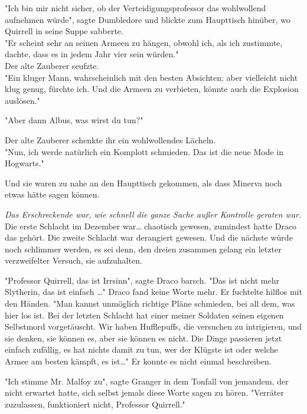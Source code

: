 {"Ich bin mir nicht sicher, ob der Verteidigungsprofessor das wohlwollend aufnehmen würde", sagte Dumbledore und blickte zum Haupttisch hinüber, wo Quirrell in seine Suppe sabberte.\\ "Er scheint sehr an seinen Armeen zu hängen, obwohl ich, als ich zustimmte, dachte, dass es in jedem Jahr vier sein würden."\\ Der alte Zauberer seufzte.\\ "Ein kluger Mann, wahrscheinlich mit den besten Absichten; aber vielleicht nicht klug genug, fürchte ich. Und die Armeen zu verbieten, könnte auch die Explosion auslösen."

"Aber dann Albus, was wirst du tun?"

Der alte Zauberer schenkte ihr ein wohlwollendes Lächeln.\\ "Nun, ich werde natürlich ein Komplott schmieden. Das ist die neue Mode in Hogwarts."

Und sie waren zu nahe an den Haupttisch gekommen, als dass Minerva noch etwas hätte sagen können.

\emph{Das Erschreckende war, wie schnell die ganze Sache außer Kontrolle geraten war.} Die erste Schlacht im Dezember war… chaotisch gewesen, zumindest hatte Draco das gehört. Die zweite Schlacht war derangiert gewesen. Und die nächste würde noch schlimmer werden, es sei denn, den dreien zusammen gelang ein letzter verzweifelter Versuch, sie aufzuhalten.

"Professor Quirrell, das ist Irrsinn", sagte Draco barsch. "Das ist nicht mehr Slytherin, das ist einfach …" Draco fand keine Worte mehr. Er fuchtelte hilflos mit den Händen. "Man kannst unmöglich richtige Pläne schmieden, bei all dem, was hier los ist. Bei der letzten Schlacht hat einer meiner Soldaten seinen eigenen Selbstmord vorgetäuscht. Wir haben Hufflepuffs, die versuchen zu intrigieren, und sie denken, sie können es, aber sie können es nicht. Die Dinge passieren jetzt einfach zufällig, es hat nichts damit zu tun, wer der Klügste ist oder welche Armee am besten kämpft, es ist…" Er konnte es nicht einmal beschreiben.

"Ich stimme Mr. Malfoy zu", sagte Granger in dem Tonfall von jemandem, der nicht erwartet hatte, sich selbst jemals diese Worte sagen zu hören. "Verräter zuzulassen, funktioniert nicht, Professor Quirrell."

}
